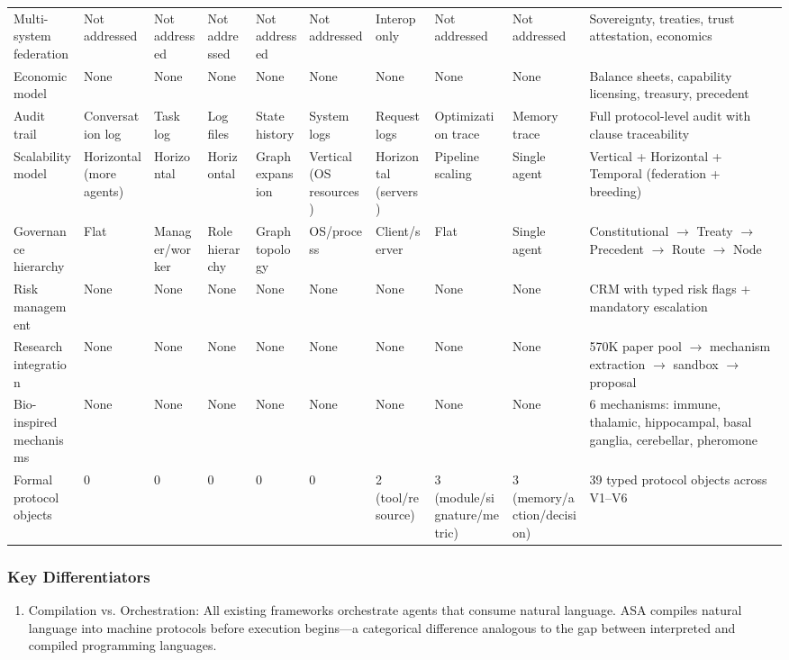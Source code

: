 \documentclass[12pt,a4paper]{article}
\begin{document}
\begin{table}[htbp]
\begin{tabular}{llllllllll}
Multi-system federation & Not addressed & Not addressed & Not addressed & Not addressed & Not addressed & Interop only & Not addressed & Not addressed & Sovereignty, treaties, trust attestation, economics \\
Economic model & None & None & None & None & None & None & None & None & Balance sheets, capability licensing, treasury, precedent \\
Audit trail & Conversation log & Task log & Log files & State history & System logs & Request logs & Optimization trace & Memory trace & Full protocol-level audit with clause traceability \\
Scalability model & Horizontal (more agents) & Horizontal & Horizontal & Graph expansion & Vertical (OS resources) & Horizontal (servers) & Pipeline scaling & Single agent & Vertical + Horizontal + Temporal (federation + breeding) \\
Governance hierarchy & Flat & Manager/worker & Role hierarchy & Graph topology & OS/process & Client/server & Flat & Single agent & Constitutional $\rightarrow$ Treaty $\rightarrow$ Precedent $\rightarrow$ Route $\rightarrow$ Node \\
Risk management & None & None & None & None & None & None & None & None & CRM with typed risk flags + mandatory escalation \\
Research integration & None & None & None & None & None & None & None & None & 570K paper pool $\rightarrow$ mechanism extraction $\rightarrow$ sandbox $\rightarrow$ proposal \\
Bio-inspired mechanisms & None & None & None & None & None & None & None & None & 6 mechanisms: immune, thalamic, hippocampal, basal ganglia, cerebellar, pheromone \\
Formal protocol objects & 0 & 0 & 0 & 0 & 0 & 2 (tool/resource) & 3 (module/signature/metric) & 3 (memory/action/decision) & 39 typed protocol objects across V1--V6 \\
\bottomrule
\end{tabular}
\end{table}


\subsubsection{Key Differentiators}


\begin{enumerate}
  \item Compilation vs. Orchestration: All existing frameworks orchestrate agents that consume natural language. ASA compiles natural language into machine protocols before execution begins---a categorical difference analogous to the gap between interpreted and compiled programming languages.
\end{enumerate}
\end{document}
